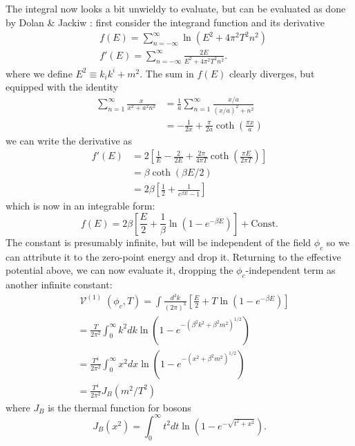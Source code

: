 \documentclass[%
 reprint,
nofootinbib,
 amsmath,amssymb,
 aps,
floatfix,
]{revtex4-1}
\DeclareMathOperator{\V}{\mathcal{V}}
\begin{document}
The integral now looks a bit unwieldy to evaluate, but can be evaluated as done by Dolan \& Jackiw \cite{dj74}: first consider the integrand function and its derivative
\begin{align}
    &f(E) = \sum_{n=-\infty}^{\infty} \ln \left(E^2 + 4\pi^2T^2n^2\right) \\
    &f'(E) = \sum_{n=-\infty}^{\infty} \frac{2E}{E^2 + 4\pi^2T^2n^2}.
\end{align}
where we define $E^2 \equiv k_ik^i + m^2$.
The sum in $f(E)$ clearly diverges, but equipped with the identity
\begin{align}
    \sum_{n=1}^{\infty} \frac{x}{x^2+a^2n^2} &= \frac{1}{a}\sum_{n=1}^{\infty}\frac{x/a}{(x/a)^2+n^2} \\
    &= -\frac{1}{2x} + \frac{\pi}{2a}\coth\left(\frac{\pi x}{a}\right)
\end{align}
we can write the derivative as
\begin{align}
    f'(E) &= 2\left[\frac{1}{E} - \frac{2}{2E} + \frac{2\pi}{4\pi T} \coth\left(\frac{\pi E}{2\pi T}\right)\right] \\
    &= \beta \coth \left(\beta E/2\right) \\
    &= 2\beta \left[\frac{1}{2} + \frac{1}{e^{\beta E}-1}\right]
\end{align}
which is now in an integrable form:
\begin{equation}
    f(E) = 2\beta \left[\frac{E}{2} + \frac{1}{\beta}\ln \left(1-e^{-\beta E}\right)\right] + \text{Const}.
\end{equation}
The constant is presumably infinite, but will be independent of the field $\phi_c$ so we can attribute it to the zero-point energy and drop it. Returning to the effective potential above, we can now evaluate it, dropping the $\phi_c$-independent term as another infinite constant:
\begin{align}
    &\V^{(1)}(\phi_c, T) = \int \frac{d^3k}{(2\pi)^3} \left[\frac{E}{2} + T\ln \left(1-e^{-\beta E}\right)\right] \label{eq:1}
    \\
    &= \frac{T}{2\pi^2} \int_{0}^{\infty} k^2 dk \ln \left(1-e^{-(\beta^2 k^2 + \beta^2 m^2)^{1/2}}\right) \\
    &= \frac{T^4}{2\pi^2} \int_{0}^{\infty} x^2 dx \ln \left(1-e^{-(x^2 + \beta^2m^2)^{1/2}}\right) \\
    &= \frac{T^4}{2\pi^2} J_B(m^2/T^2)
\end{align}
where $J_B$ is the thermal function for bosons
\begin{equation}
    J_B(x^2) = \int_{0}^{\infty} t^2dt\ln \left(1-e^{-\sqrt{t^2+x^2}}\right).
\end{equation}
\end{document}
